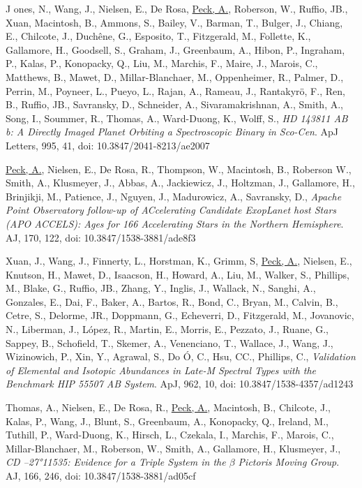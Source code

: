 J\hangindent=0.5in \noindent  ones, N., Wang, J., Nielsen, E., De Rosa, \underline{Peck, A.}, Roberson, W., Ruffio, JB., Xuan, Macintosh, B., Ammons, S., Bailey, V., Barman, T., Bulger, J., Chiang, E.,  Chilcote, J., Duchêne, G., Esposito, T., Fitzgerald, M., Follette, K., Gallamore, H., Goodsell, S., Graham, J., Greenbaum, A., Hibon, P., Ingraham, P., Kalas, P., Konopacky, Q., Liu, M., Marchis, F., Maire, J., Marois, C., Matthews, B., Mawet, D., Millar-Blanchaer, M., Oppenheimer, R., Palmer, D., Perrin, M., Poyneer, L., Pueyo, L., Rajan, A., Rameau, J., Rantakyrö, F., Ren, B., Ruffio, JB., Savransky, D., Schneider, A., Sivaramakrishnan, A., Smith, A., Song, I., Soummer, R., Thomas, A., Ward-Duong, K., Wolff, S., \textit{HD 143811 AB b: A Directly Imaged Planet Orbiting a Spectroscopic Binary in Sco-Cen}. ApJ Letters, 995, 41, doi: 10.3847/2041-8213/ae2007
 
\hangindent=0.5in \noindent \underline{Peck, A.}, Nielsen, E., De Rosa, R., Thompson, W., Macintosh, B.,  Roberson W., Smith, A., Klusmeyer, J., Abbas, A., Jackiewicz, J., Holtzman, J., Gallamore, H., Brinjikji, M., Patience, J., Nguyen, J., Madurowicz, A., Savransky, D., \textit{Apache Point Observatory follow-up of ACcelerating Candidate ExopLanet host Stars (APO ACCELS): Ages for 166 Accelerating Stars in the Northern Hemisphere}. AJ, 170, 122, doi: 10.3847/1538-3881/ade8f3
 
\hangindent=0.5in \noindent  Xuan, J., Wang, J., Finnerty, L., Horstman, K., Grimm, S, \underline{Peck, A.}, Nielsen, E., Knutson, H., Mawet, D., Isaacson, H., Howard, A., Liu, M., Walker, S., Phillips, M., Blake, G.,  Ruffio, JB.,  Zhang, Y., Inglis, J., Wallack, N., Sanghi, A., Gonzales, E., Dai, F., Baker, A., Bartos, R., Bond, C., Bryan, M., Calvin, B., Cetre, S., Delorme, JR., Doppmann, G., Echeverri, D., Fitzgerald, M., Jovanovic, N., Liberman, J., López, R., Martin, E., Morris, E., Pezzato, J., Ruane, G., Sappey, B., Schofield, T., Skemer, A., Venenciano, T., Wallace, J., Wang, J., Wizinowich, P., Xin, Y., Agrawal, S., Do Ó, C., Hsu, CC., Phillips, C., \textit{Validation of Elemental and Isotopic Abundances in Late-M Spectral Types with the Benchmark HIP 55507 AB System}. ApJ, 962, 10, doi: 10.3847/1538-4357/ad1243

\hangindent=0.5in \noindent  Thomas, A., Nielsen, E., De Rosa, R., \underline{Peck, A.}, Macintosh, B., Chilcote, J., Kalas, P., Wang, J., Blunt, S., Greenbaum, A., Konopacky, Q., Ireland, M., Tuthill, P., Ward-Duong, K., Hirsch, L., Czekala, I., Marchis, F., Marois, C., Millar-Blanchaer, M., Roberson, W., Smith, A., Gallamore, H., Klusmeyer, J., \textit{CD –27°11535: Evidence for a Triple System in the $\beta$ Pictoris Moving Group}. AJ, 166, 246, doi: 10.3847/1538-3881/ad05cf

